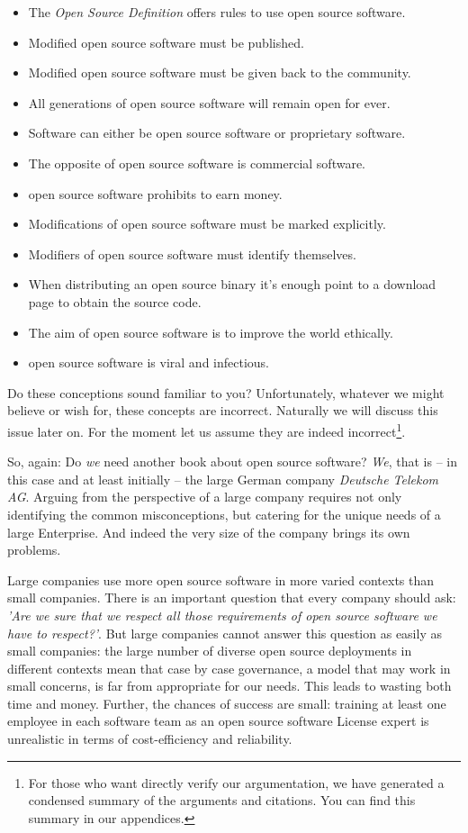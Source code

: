 \begin{itemize}
  \item The \emph{Open Source Definition} offers rules to use open source software.
  \item Modified open source software must be published.
  \item Modified open source software must be given back to the community.
  \item All generations of open source software will remain open for ever.
  \item Software can either be open source software or proprietary software.
  \item The opposite of open source software is commercial software.
  \item open source software prohibits to earn money.
  \item Modifications of open source software must be marked explicitly.
  \item Modifiers of open source software must identify themselves.
  \item When distributing an open source binary it’s enough point to a download
  page to obtain the source code.
  \item The aim of open source software is to improve the world ethically.
  \item open source software is viral and infectious.
\end{itemize}

Do these conceptions sound familiar to you? Unfortunately, whatever we might
believe or wish for, these concepts are incorrect. Naturally we will discuss
this issue later on. For the moment let us assume they are indeed
incorrect\footnote{For those who want directly verify our argumentation, we have
generated a condensed summary of the arguments and citations. You can find this
summary in our appendices.}.

So, again: Do \emph{we} need another book about open source software? \emph{We},
that is -- in this case and at least initially -- the large German company
\textit{Deutsche Telekom AG}. Arguing from the perspective of a large company
requires not only identifying the common misconceptions, but catering for the
unique needs of a large Enterprise. And indeed the very size of the company
brings its own problems.

Large companies use more open source software in more varied contexts than small
companies. There is an important question that every company should ask:
\emph{'Are we sure that we respect all those requirements of open source
software we have to respect?'}. But large companies cannot answer this question
as easily as small companies: the large number of diverse open source
deployments in different contexts mean that case by case governance, a model
that may work in small concerns, is far from appropriate for our needs. This
leads to wasting both time and money. Further, the chances of success are small:
training at least one employee in each software team as an open source software
License expert is unrealistic in terms of cost-efficiency and reliability.

